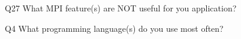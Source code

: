 \begin{description}%
\item{Q27} What MPI feature(s) are NOT useful for you application?%
\item{Q4} What programming language(s) do you use most often?%
\end{description}%
